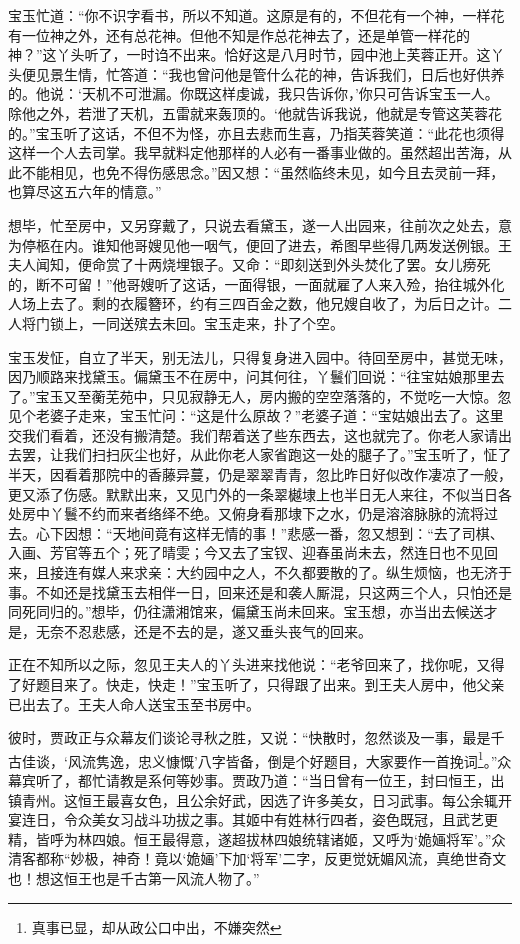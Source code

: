 \documentclass[12pt,oneside]{book}
\begin{document}
宝玉忙道：“你不识字看书，所以不知道。这原是有的，不但花有一个神，一样花有一位神之外，还有总花神。但他不知是作总花神去了，还是单管一样花的神？”这丫头听了，一时诌不出来。恰好这是八月时节，园中池上芙蓉正开。这丫头便见景生情，忙答道：“我也曾问他是管什么花的神，告诉我们，日后也好供养的。他说：‘天机不可泄漏。你既这样虔诚，我只告诉你，’你只可告诉宝玉一人。除他之外，若泄了天机，五雷就来轰顶的。‘他就告诉我说，他就是专管这芙蓉花的。”宝玉听了这话，不但不为怪，亦且去悲而生喜，乃指芙蓉笑道：“此花也须得这样一个人去司掌。我早就料定他那样的人必有一番事业做的。虽然超出苦海，从此不能相见，也免不得伤感思念。”因又想：“虽然临终未见，如今且去灵前一拜，也算尽这五六年的情意。”

想毕，忙至房中，又另穿戴了，只说去看黛玉，遂一人出园来，往前次之处去，意为停柩在内。谁知他哥嫂见他一咽气，便回了进去，希图早些得几两发送例银。王夫人闻知，便命赏了十两烧埋银子。又命：“即刻送到外头焚化了罢。女儿痨死的，断不可留！”他哥嫂听了这话，一面得银，一面就雇了人来入殓，抬往城外化人场上去了。剩的衣履簪环，约有三四百金之数，他兄嫂自收了，为后日之计。二人将门锁上，一同送殡去未回。宝玉走来，扑了个空。

宝玉发怔，自立了半天，别无法儿，只得复身进入园中。待回至房中，甚觉无味，因乃顺路来找黛玉。偏黛玉不在房中，问其何往，丫鬟们回说：“往宝姑娘那里去了。”宝玉又至蘅芜苑中，只见寂静无人，房内搬的空空落落的，不觉吃一大惊。忽见个老婆子走来，宝玉忙问：“这是什么原故？”老婆子道：“宝姑娘出去了。这里交我们看着，还没有搬清楚。我们帮着送了些东西去，这也就完了。你老人家请出去罢，让我们扫扫灰尘也好，从此你老人家省跑这一处的腿子了。”宝玉听了，怔了半天，因看着那院中的香藤异蔓，仍是翠翠青青，忽比昨日好似改作凄凉了一般，更又添了伤感。默默出来，又见门外的一条翠樾埭上也半日无人来往，不似当日各处房中丫鬟不约而来者络绎不绝。又俯身看那埭下之水，仍是溶溶脉脉的流将过去。心下因想：“天地间竟有这样无情的事！”悲感一番，忽又想到：“去了司棋、入画、芳官等五个；死了晴雯；今又去了宝钗、迎春虽尚未去，然连日也不见回来，且接连有媒人来求亲：大约园中之人，不久都要散的了。纵生烦恼，也无济于事。不如还是找黛玉去相伴一日，回来还是和袭人厮混，只这两三个人，只怕还是同死同归的。”想毕，仍往潇湘馆来，偏黛玉尚未回来。宝玉想，亦当出去候送才是，无奈不忍悲感，还是不去的是，遂又垂头丧气的回来。

正在不知所以之际，忽见王夫人的丫头进来找他说：“老爷回来了，找你呢，又得了好题目来了。快走，快走！”宝玉听了，只得跟了出来。到王夫人房中，他父亲已出去了。王夫人命人送宝玉至书房中。

彼时，贾政正与众幕友们谈论寻秋之胜，又说：“快散时，忽然谈及一事，最是千古佳谈，‘风流隽逸，忠义慷慨’八字皆备，倒是个好题目，大家要作一首挽词\footnote{真事已显，却从政公口中出，不嫌突然}。”众幕宾听了，都忙请教是系何等妙事。贾政乃道：“当日曾有一位王，封曰恒王，出镇青州。这恒王最喜女色，且公余好武，因选了许多美女，日习武事。每公余辄开宴连日，令众美女习战斗功拔之事。其姬中有姓林行四者，姿色既冠，且武艺更精，皆呼为林四娘。恒王最得意，遂超拔林四娘统辖诸姬，又呼为‘姽婳将军’。”众清客都称“妙极，神奇！竟以‘姽婳’下加‘将军’二字，反更觉妩媚风流，真绝世奇文也！想这恒王也是千古第一风流人物了。”
\end{document}
